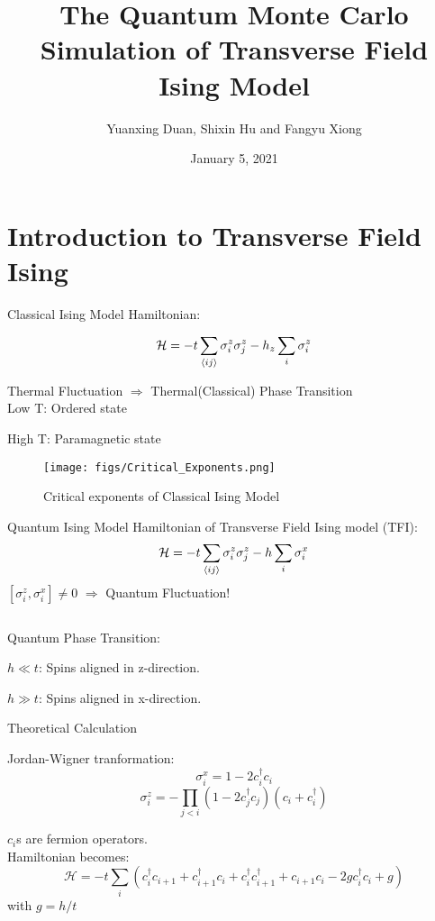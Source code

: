 \documentclass[aspectratio=43]{beamer}
\title{The Quantum Monte Carlo Simulation of Transverse Field Ising Model}
\author{Yuanxing Duan, Shixin Hu and Fangyu Xiong}
\institute{School of Physics, Peking University}
\date{January 5, 2021}
\begin{document}
\maketitle

\section{Introduction to Transverse Field Ising}
\begin{frame}{Classical Ising Model}
Hamiltonian:

\[
\mathcal{H}=-t\sum_{\braket{ij}}\sigma_i^z\sigma_j^z-h_z\sum_{i}\sigma_i^z
\]

Thermal Fluctuation $\Longrightarrow$ Thermal(Classical) Phase Transition
\[
\]
Low T: Ordered state

High T: Paramagnetic state
\end{frame}

\begin{frame}
\begin{figure}[htpb]
	\centering
	\texttt{[image: figs/Critical\_Exponents.png]}
	\caption{Critical exponents of Classical Ising Model}
	\label{fig:Critical Exponents}
\end{figure}
\end{frame}

\begin{frame}{Quantum Ising Model}
Hamiltonian of Transverse Field Ising model (TFI):
\[
\mathcal{H}=-t\sum_{\braket{ij}}\sigma_i^z\sigma_j^z-h\sum_{i}\sigma_i^x
\]
$[\sigma_i^z,\sigma_i^x]\ne0$ $\Longrightarrow$ Quantum Fluctuation!

\[
\]

Quantum Phase Transition:

$h\ll t$: Spins aligned in z-direction.

$h\gg t$: Spins aligned in x-direction.
\end{frame}

\begin{frame}{Theoretical Calculation}

Jordan-Wigner tranformation:
\[
\sigma_i^x =1-2c^{\dagger}_ic_i
\]
\[
\sigma_i^z =-\prod_{j<i}(1-2c^{\dagger}_jc_j)(c_i+c_i^{\dagger})
\]

$c_i$s are fermion operators.
\[
\]
Hamiltonian becomes:
\[
\mathcal{H}=-t\sum_{i}(c^{\dagger}_ic_{i+1}+c^{\dagger}_{i+1}c_i+c^{\dagger}_ic^{\dagger}_{i+1}+c_{i+1}c_i-2gc^{\dagger}_ic_i+g)
\]
with $g=h/t$
\end{frame}
\end{document}
